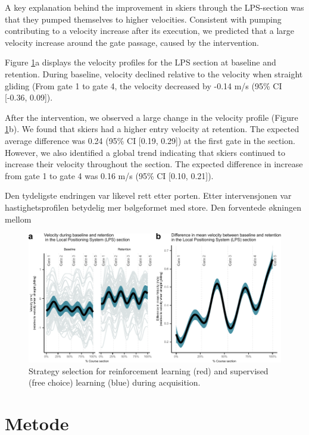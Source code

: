 \documentclass{article}
\begin{document}
A key explanation behind the improvement in skiers through the LPS-section was that they pumped themselves to higher velocities. Consistent with pumping contributing to a velocity increase after its execution, we predicted that a large velocity increase around the gate passage, caused by the intervention.

Figure \ref{fig: velocity}a displays the velocity profiles for the LPS section at baseline and retention. During baseline, velocity declined relative to the velocity when straight gliding (From gate 1 to gate 4, the velocity decreased by -0.14 m/s (95\% CI [-0.36, 0.09]).

After the intervention, we observed a large change in the velocity profile (Figure \ref{fig: velocity}b). We found that skiers had a higher entry velocity at retention. The expected average difference was 0.24 (95\% CI [0.19, 0.29]) at the first gate in the section. However, we also identified a global trend indicating that skiers continued to increase their velocity throughout the section. The expected difference in increase from gate 1 to gate 4 was 0.16 m/s (95\% CI [0.10, 0.21]).

Den tydeligste endringen var likevel rett etter porten. Etter intervensjonen var hastighetsprofilen betydelig mer bølgeformet med store. Den forventede økningen mellom


\begin{figure}[H]
\centering
\includegraphics{figurer/figure_velocity.pdf}
\caption{Strategy selection for reinforcement learning (red) and supervised (free choice) learning (blue) during acquisition.}\label{fig: velocity}
\end{figure}




\section{Metode}
\end{document}
